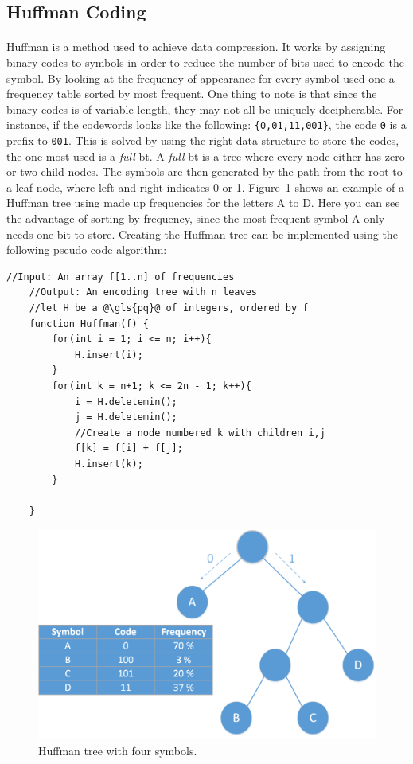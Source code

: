 \documentclass[a4paper]{report}
\newcommand{\codeword}[1]{\texttt{#1}}
\begin{document}
\subsection{Huffman Coding} %
\paragraph{}
Huffman is a method used to achieve data compression.\cite{huffman}
It works by assigning binary codes to symbols in order to reduce the number of bits used to encode the symbol.
By looking at the frequency of appearance for every symbol used one a frequency table sorted by most frequent.
One thing to note is that since the binary codes is of variable length, they may not all be uniquely decipherable.
For instance, if the codewords looks like the following: \codeword{\{0,01,11,001\}}, the code \codeword{0} is a prefix to \codeword{001}.
This is solved by using the right data structure to store the codes, the one most used is a \textit{full} \gls{bt}.
A \textit{full} \gls{bt} is a tree where every node either has zero or two child nodes.
The symbols are then generated by the path from the root to a leaf node, where left and right indicates 0 or 1.
Figure~\ref{fig:hm-ex} shows an example of a Huffman tree using made up frequencies for the letters A to D.
Here you can see the advantage of sorting by frequency, since the most frequent symbol A only needs one bit to store.
Creating the Huffman tree can be implemented using the following pseudo-code algorithm:

\begin{lstlisting}[caption=Huffman algorithm \cite{algorithms}, label=lst:huffman]
	//Input: An array f[1..n] of frequencies
	//Output: An encoding tree with n leaves
	//let H be a @\gls{pq}@ of integers, ordered by f
	function Huffman(f) {
		for(int i = 1; i <= n; i++){
			H.insert(i);
		}
		for(int k = n+1; k <= 2n - 1; k++){
			i = H.deletemin();
			j = H.deletemin();
			//Create a node numbered k with children i,j
			f[k] = f[i] + f[j];
			H.insert(k);
		}

	}
\end{lstlisting}

\begin{figure}[h!]
	\centering
		\includegraphics[width=1.0\textwidth]{images/huffman.png}
		\caption{Huffman tree with four symbols.}
		\label{fig:hm-ex}
\end{figure}
\end{document}
